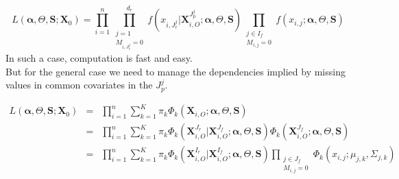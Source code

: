 \documentclass[12pt,a4paper]{report}
\begin{document}
		\begin{equation}
		L(\boldsymbol{\alpha},\Theta,\boldsymbol{S};\boldsymbol{X}_0)=\prod_{i=1}^n\prod_{\substack{j =1 \\ M_{i,J_r^j}=0}}^{d_r}f(x_{i,J_r^j}|\boldsymbol{X}^{J_p^j}_{i,O};\boldsymbol{\alpha},\Theta,\boldsymbol{S})\prod_{\substack{j \in I_f \\ M_{i,j}=0}}f(x_{i,j};\boldsymbol{\alpha},\Theta,\boldsymbol{S}) \label{simplemisslik}
\end{equation}		
	In such a case, computation is fast and easy.\\

 
		But for the general case we need to manage the dependencies implied by missing values in common covariates in the $J_p^j$.
		
\begin{eqnarray}
L(\boldsymbol{\alpha},\Theta,\boldsymbol{S};\boldsymbol{X}_0)&=&\prod_{i=1}^n\sum_{k=1}^{K} \pi_{k} \Phi_k(\boldsymbol{X}_{i,O};\boldsymbol{\alpha},\Theta,\boldsymbol{S})\\
&=&\prod_{i=1}^n\sum_{k=1}^{K} \pi_{k} \Phi_k(\boldsymbol{X}_{i,O}^{J_r}|\boldsymbol{X}_{i,O}^{J_f};\boldsymbol{\alpha},\Theta,\boldsymbol{S})\Phi_k(\boldsymbol{X}_{i,O}^{J_f};\boldsymbol{\alpha},\Theta,\boldsymbol{S})\\
&=&\prod_{i=1}^n\sum_{k=1}^{K} \pi_{k} \Phi_k(\boldsymbol{X}_{i,O}^{I_r}|\boldsymbol{X}_{i,O}^{I_f};\boldsymbol{\alpha},\Theta,\boldsymbol{S})\prod_{\substack{j \in J_f \\ M_{i,j}=0}}\Phi_k(x_{i,j};\mu_{j,k},\Sigma_{j,k}) \label{liklihoodmissglobal}
\end{eqnarray}		
\end{document}
